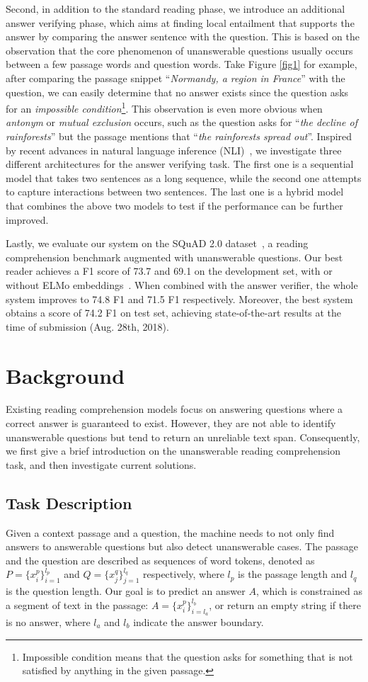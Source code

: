 \documentclass[letterpaper]{article} \usepackage{aaai19}  \usepackage{times}  \usepackage{helvet}  \usepackage{courier}  \usepackage{url}  \usepackage{graphicx}  \usepackage{pbox}
\begin{document}
Second, in addition to the standard reading phase, we introduce an additional answer verifying phase, which aims at finding local entailment that supports the answer by comparing the answer sentence with the question.
This is based on the observation that the core phenomenon of unanswerable questions usually occurs between a few passage words and question words.
Take Figure \ref{fig1} for example, after comparing the passage snippet ``\emph{Normandy, a region in France}'' with the question, we can easily determine that no answer exists since the question asks for an \emph{impossible condition}\footnote{Impossible condition means that the question asks for something that is not satisfied by anything in the given passage.}.
This observation is even more obvious when \emph{antonym} or \emph{mutual exclusion} occurs, such as the question asks for ``\emph{the decline of rainforests}'' but the passage mentions that ``\emph{the rainforests spread out}''.
Inspired by recent advances in natural language inference (NLI)~\cite{Bowman15}, we investigate three different architectures for the answer verifying task.
The first one is a sequential model that takes two sentences as a long sequence, while the second one attempts to capture interactions between two sentences.
The last one is a hybrid model that combines the above two models to test if the performance can be further improved.

Lastly, we evaluate our system on the SQuAD 2.0 dataset~\cite{Rajpurkar18}, a reading comprehension benchmark augmented with unanswerable questions. Our best reader achieves a F1 score of 73.7 and 69.1 on the development set, with or without ELMo embeddings~\cite{Elmo17}.
When combined with the answer verifier, the whole system improves to 74.8 F1 and 71.5 F1 respectively.
Moreover, the best system obtains a score of 74.2 F1 on test set, achieving state-of-the-art results at the time of submission (Aug. 28th, 2018).
 \section{Background}
Existing reading comprehension models focus on answering questions where a correct answer is guaranteed to exist.
However, they are not able to identify unanswerable questions but tend to return an unreliable text span.
Consequently, we first give a brief introduction on the unanswerable reading comprehension task, and then investigate current solutions.

\subsection{Task Description}
Given a context passage and a question, the machine needs to not only find answers to answerable questions but also detect unanswerable cases. 
The passage and the question are described as sequences of word tokens, denoted as $P=\{x_i^p\}_{i=1}^{l_p}$ and $Q=\{x_j^q\}_{j=1}^{l_q}$ respectively, where $l_p$ is the passage length and $l_q$ is the question length. 
Our goal is to predict an answer $A$, which is constrained as a segment of text in the passage: $A=\{x_i^p\}_{i=l_a}^{l_b}$, or return an empty string if there is no answer, where $l_a$ and $l_b$ indicate the answer boundary. 
\end{document}
